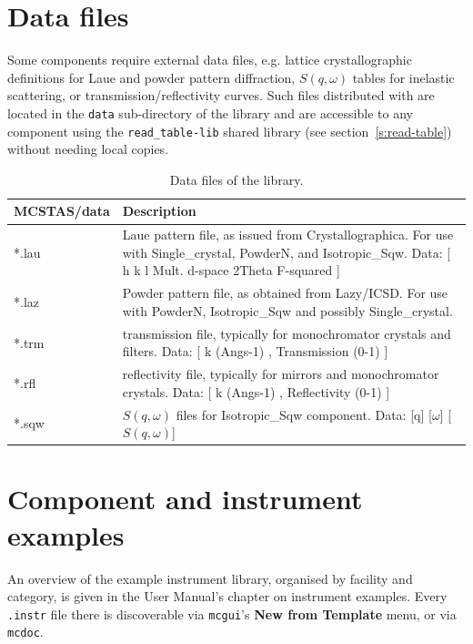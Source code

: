 \section{Data files}

Some components require external data files, e.g. lattice crystallographic
definitions for Laue and powder pattern diffraction, $S(q,\omega)$ tables
for inelastic scattering, or transmission/reflectivity curves. Such files
distributed with \MCS are located in the \verb+data+ sub-directory of the
library and are accessible to any component using the \texttt{read\_table-lib}
shared library (see section~\ref{s:read-table}) without needing local
copies.

\begin{table}
  \begin{center}
    {\let\my=\\
    \begin{tabular}{|p{}|p{}|}
      \hline
       \textbf{MCSTAS/data} & Description \\
       \hline
 *.lau & Laue pattern file, as issued from Crystallographica.
       For use with Single\_crystal, PowderN, and Isotropic\_Sqw.
       Data: [ h   k   l Mult. d-space 2Theta   F-squared ] \\
 *.laz & Powder pattern file, as obtained from Lazy/ICSD.
       For use with PowderN, Isotropic\_Sqw and possibly Single\_crystal.\\
 *.trm & transmission file, typically for monochromator crystals and filters.
       Data: [ k (Angs-1) , Transmission (0-1) ] \\
 *.rfl & reflectivity file, typically for mirrors and monochromator crystals.
       Data: [ k (Angs-1) , Reflectivity (0-1) ] \\
 *.sqw & $S(q,\omega)$ files for Isotropic\_Sqw component.
       Data: [q] [$\omega$] [$S(q,\omega)$]\\
      \hline
    \end{tabular}
    \caption{Data files of the \MCS library.}
    \label{t:comp-data}
    }
  \end{center}
\end{table}

\section{Component and instrument examples}

An overview of the example instrument library, organised by facility and
category, is given in the User Manual's chapter on instrument examples.
Every
\texttt{.instr} file there is discoverable via \verb+mcgui+'s
\textbf{New from Template} menu, or via \verb+mcdoc+.
